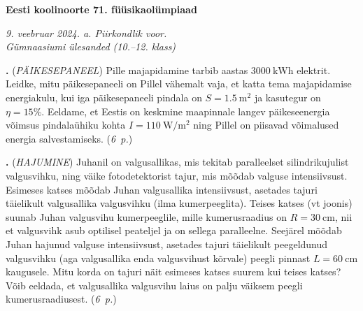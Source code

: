 \documentclass[11pt,a5paper]{article}
\newcommand{\numb}[1]{\vspace{5pt}\textbf{\large #1}}
\newcommand{\nimi}[1]{(\textsl{\small #1})}
\newcommand{\punktid}[1]{(\emph{#1~p.})}
\newcounter{ylesanne}
\newcommand{\yl}[1]{\addtocounter{ylesanne}{1}\numb{\theylesanne.} \nimi{#1} \newblock{}}
\newcommand{\autor}[1]{}%
\begin{document}
\begin{center}
  \textbf{\Large Eesti koolinoorte 71. füüsikaolümpiaad} \par
  \emph{9. veebruar 2024. a. Piirkondlik voor.\\Gümnaasiumi ülesanded (10.--12. klass)}
\end{center}

 \par


\yl{PÄIKESEPANEEL} Pille majapidamine tarbib aastas $\SI{3000}{\kWh}$ elektrit. Leidke, mitu päikesepaneeli on Pillel vähemalt vaja, et katta tema majapidamise energiakulu, kui iga päikesepaneeli pindala on $S = \SI{1.5}{\m\squared}$ ja kasutegur on $\eta = 15\%$. Eeldame, et Eestis on keskmine maapinnale langev päikeseenergia võimsus pindalaühiku kohta $I = \SI{110}{\W\per\m\squared}$ ning Pillel on piisavad võimalused energia salvestamiseks.
\punktid{6} \autor{Richard Luhtaru}

\yl{HAJUMINE} Juhanil on valgusallikas, mis tekitab paralleelset silindrikujulist valgusvihku, ning väike fotodetektorist tajur, mis mõõdab valguse intensiivsust. Esimeses katses mõõdab Juhan valgusallika intensiivsust, asetades tajuri täielikult valgusallika valgusvihku (ilma kumerpeeglita). Teises katses (vt joonis) suunab Juhan valgusvihu kumerpeeglile, mille kumerusraadius on $R=\SI{30}{\centi\m}$, nii et valgusvihk asub optilisel peateljel ja on sellega paralleelne. Seejärel mõõdab Juhan hajunud valguse intensiivsust, asetades tajuri täielikult peegeldunud valgusvihku (aga valgusallika enda valgusvihust kõrvale) peegli pinnast $L=\SI{60}{\centi\m}$ kaugusele. Mitu korda on tajuri näit esimeses katses suurem kui teises katses? Võib eeldada, et valgusallika valgusvihu laius on palju väiksem peegli kumerusraadiusest.
\punktid{6} \autor{Moorits Mihkel Muru}
\end{document}
